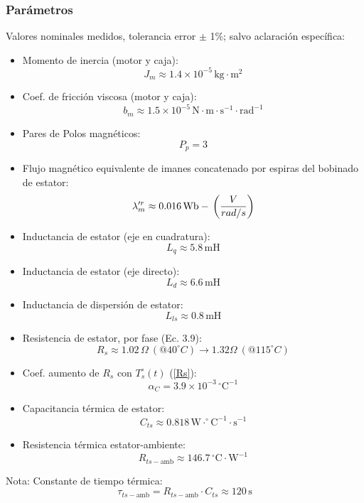 \documentclass[a4paper, 10pt, onecolumn,journal]{ieeeconf}
\begin{document}
\subsubsection{\textbf{Parámetros}} Valores nominales medidos, tolerancia error $\pm$ 1\%; salvo aclaración específica:
\begin{itemize}
    \item Momento de inercia (motor y caja):
    \[J_m \approx 1.4 \times 10^{-5} \, \text{kg} \cdot \text{m}^2\]
    \item Coef. de fricción viscosa (motor y caja):
    \[b_m \approx 1.5 \times 10^{-5} \, \text{N} \cdot \text{m} \cdot \text{s}^{-1} \cdot \text{rad}^{-1}\]
    \item Pares de Polos magnéticos: 
    \[P_p = 3\]
    \item Flujo magnético equivalente de imanes concatenado por espiras del bobinado de estator:
    \[\lambda_m'^{r} \approx 0.016 \, \text{Wb} \\-\\ \left(\frac{V}{rad/s}\right)\]
    \item Inductancia de estator (eje en cuadratura):
    \[L_q \approx 5.8 \, \text{mH}\]
    \item Inductancia de estator (eje directo):
    \[L_d \approx 6.6 \, \text{mH}\]
    \item Inductancia de dispersión de estator:
    \[L_{ls} \approx 0.8 \, \text{mH}\]
    \item Resistencia de estator, por fase (Ec. 3.9):
    \[R_s \approx 1.02 \, \Omega \ (@40 ^\circ C) \rightarrow 1.32 \Omega \ (@115 ^\circ C)\]
    \item Coef. aumento de $R_s$ con $T_s^\circ(t)$ (\ref{Rs}): \[\alpha_C = 3.9 \times 10^{-3} \, ^{\circ}\text{C}^{-1}\]
    \item Capacitancia térmica de estator:
    \[C_{ts} \approx 0.818 \, \text{W} \cdot ^{\circ}\text{C}^{-1} \cdot \text{s}^{-1}\]
    \item Resistencia térmica estator-ambiente:
    \[R_{ts-\text{amb}} \approx 146.7 \, ^{\circ}\text{C} \cdot \text{W}^{-1}\]
\end{itemize}
Nota: Constante de tiempo térmica:
\[\tau_{ts-\text{amb}} = R_{ts-\text{amb}} \cdot C_{ts} \approx 120 \, \text{s}\]
\end{document}
